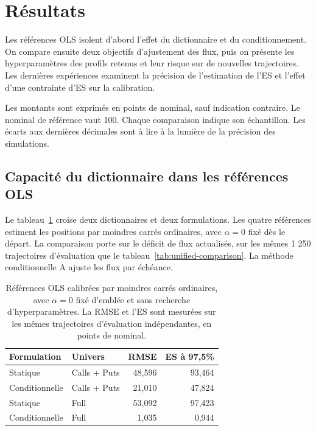 \section{Résultats}

Les références OLS isolent d'abord l'effet du dictionnaire et du conditionnement. On compare ensuite deux objectifs d'ajustement des flux, puis on présente les hyperparamètres des profils retenus et leur risque sur de nouvelles trajectoires. Les dernières expériences examinent la précision de l'estimation de l'ES et l'effet d'une contrainte d'ES sur la calibration.

Les montants sont exprimés en points de nominal, sauf indication contraire. Le nominal de référence vaut 100. Chaque comparaison indique son échantillon. Les écarts aux dernières décimales sont à lire à la lumière de la précision des simulations.

\subsection{Capacité du dictionnaire dans les références OLS}

Le tableau~\ref{tab:ols-capacity} croise deux dictionnaires et deux formulations. Les quatre références estiment les positions par moindres carrés ordinaires, avec $\alpha=0$ fixé dès le départ. La comparaison porte sur le déficit de flux actualisés, sur les mêmes 1 250 trajectoires d'évaluation que le tableau~\ref{tab:unified-comparison}. La méthode conditionnelle A ajuste les flux par échéance.

\begin{table}[htbp]
\centering
\small
\begin{tabular}{llrr}
\toprule
Formulation & Univers & RMSE & ES à 97,5\% \\
\midrule
Statique & Calls + Puts & 48,596 & 93,464 \\
Conditionnelle & Calls + Puts & 21,010 & 47,824 \\
Statique & Full & 53,092 & 97,423 \\
Conditionnelle & Full & 1,035 & 0,944 \\
\bottomrule
\end{tabular}
\caption{Références OLS calibrées par moindres carrés ordinaires, avec $\alpha=0$ fixé d'emblée et sans recherche d'hyperparamètres. La RMSE et l'ES sont mesurées sur les mêmes trajectoires d'évaluation indépendantes, en points de nominal.}
\label{tab:ols-capacity}
\end{table}

